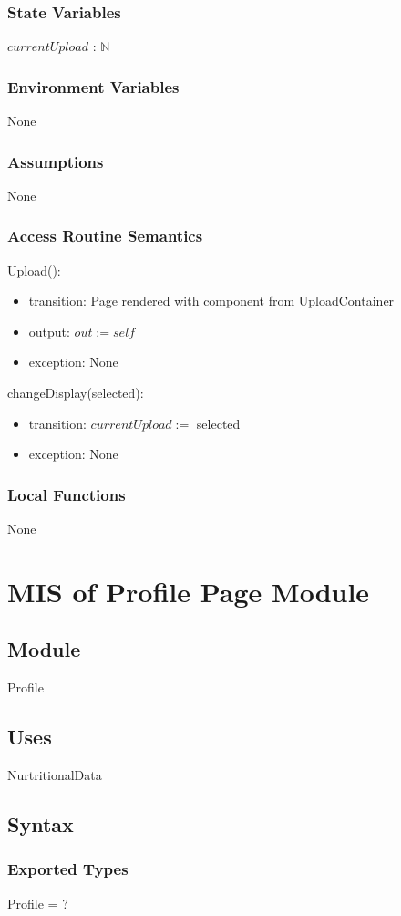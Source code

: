 \documentclass[12pt, titlepage]{article}
\begin{document}
\subsubsection{State Variables}
$currentUpload$ : $\mathbb{N}$
\subsubsection{Environment Variables}
None
\subsubsection{Assumptions}
None
\subsubsection{Access Routine Semantics}
\noindent Upload():
\begin{itemize}
	\item transition: Page rendered with component from UploadContainer
	\item output: $out := self$
	\item exception: None
\end{itemize}

\noindent changeDisplay(selected):
\begin{itemize}
	\item transition: $currentUpload :=$ selected
	\item exception: None
\end{itemize}
\subsubsection{Local Functions}
None

\newpage

\section{MIS of Profile Page Module} \label{ProfilePage}
\subsection{Module}
Profile
\subsection{Uses}
NurtritionalData
\subsection{Syntax}
\subsubsection{Exported Types}
Profile = ?
\end{document}
